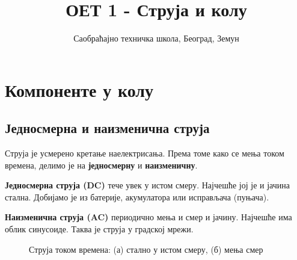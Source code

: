 \documentclass{article}
\title{ОЕТ 1 - Струја и колу}
\author{Саобраћајно техничка школа, Београд, Земун}
\begin{document}
\maketitle

\section{Компоненте у колу}

\subsection{Једносмерна и наизменична струја}

Струја је усмерено кретање наелектрисања. Према томе како се мења током времена, делимо је на \textbf{једносмерну} и \textbf{наизменичну}.

\textbf{Једносмерна струја (DC)} тече увек у истом смеру. Најчешће јој је и јачина стална. Добијамо је из батерије, акумулатора или исправљача (пуњача).

\textbf{Наизменична струја (AC)} периодично мења и смер и јачину. Најчешће има облик синусоиде. Таква је струја у градској мрежи.

\begin{figure}[H]
    \centering
    \caption{Струја током времена: (а) стално у истом смеру, (б) мења смер}
    \label{fig:dc-ac}
\end{figure}
\end{document}
